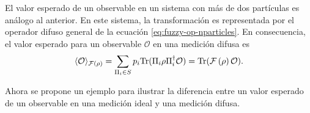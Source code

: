 El valor esperado de un observable en un sistema con más de dos partículas es análogo al anterior. En este sistema, la transformación es representada por el operador difuso general de la ecuación {\eqref{eq:fuzzy-op-nparticles}}. En consecuencia, el valor esperado para un observable $\mathcal{O}$ en una medición difusa es\begin{equation}\label{eq:expected-value-fm-general}
    \langle \mathcal{O}\rangle_{\mathcal{F}\left(\rho\right)}=\sum_{\Pi_i\in S}p_i{\rm Tr}(\Pi_{i}\rho\Pi_{i}^{\dagger}\mathcal{O}) ={\rm Tr}(\mathcal{F}\left(\rho\right)\mathcal{O}).
\end{equation}



 

Ahora se propone un ejemplo para ilustrar la diferencia entre un valor esperado de un observable en una medición ideal y una medición difusa. 


